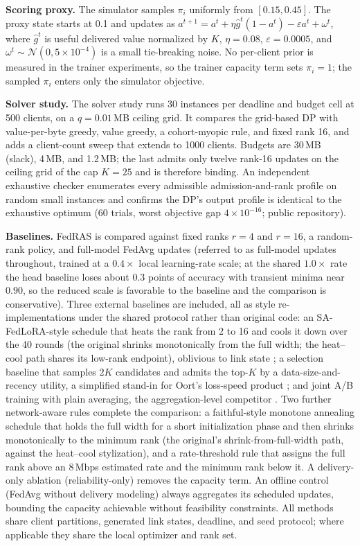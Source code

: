 \documentclass[a4paper,fleqn]{cas-dc}
\begin{document}
\par
\textbf{Scoring proxy.} The simulator samples $\pi_i$ uniformly from $[0.15,0.45]$. The proxy state starts at 0.1 and updates as $a^{t+1}=a^t+\eta\hat g^t(1-a^t)-\varepsilon a^t+\omega^t$, where $\hat g^t$ is useful delivered value normalized by $K$, $\eta=0.08$, $\varepsilon=0.0005$, and $\omega^t\sim\mathcal N(0,5\times10^{-4})$ is a small tie-breaking noise. No per-client prior is measured in the trainer experiments, so the trainer capacity term sets $\pi_i = 1$; the sampled $\pi_i$ enters only the simulator objective.
\par
\textbf{Solver study.} The solver study runs 30 instances per deadline and budget cell at 500 clients, on a $q = 0.01$\,MB ceiling grid. It compares the grid-based DP with value-per-byte greedy, value greedy, a cohort-myopic rule, and fixed rank 16, and adds a client-count sweep that extends to 1000 clients. Budgets are 30\,MB (slack), 4\,MB, and 1.2\,MB; the last admits only twelve rank-16 updates on the ceiling grid of the cap $K = 25$ and is therefore binding. An independent exhaustive checker enumerates every admissible admission-and-rank profile on random small instances and confirms the DP's output profile is identical to the exhaustive optimum (60 trials, worst objective gap $4\times10^{-16}$; public repository).
\par
\textbf{Baselines.} FedRAS is compared against fixed ranks $r = 4$ and $r = 16$, a random-rank policy, and full-model FedAvg updates (referred to as full-model updates throughout, trained at a $0.4\times$ local learning-rate scale; at the shared $1.0\times$ rate the head baseline loses about $0.3$ points of accuracy with transient minima near $0.90$, so the reduced scale is favorable to the baseline and the comparison is conservative). Three external baselines are included, all as style re-implementations under the shared protocol rather than original code: an SA-FedLoRA-style schedule that heats the rank from 2 to 16 and cools it down over the 40 rounds (the original shrinks monotonically from the full width; the heat--cool path shares its low-rank endpoint), oblivious to link state \cite{yang2024safedlora}; a selection baseline that samples $2K$ candidates and admits the top-$K$ by a data-size-and-recency utility, a simplified stand-in for Oort's loss-speed product \cite{oort2021oort}; and joint A/B training with plain averaging, the aggregation-level competitor \cite{guo2025fedsalora}. Two further network-aware rules complete the comparison: a faithful-style monotone annealing schedule that holds the full width for a short initialization phase and then shrinks monotonically to the minimum rank (the original's shrink-from-full-width path, against the heat--cool stylization), and a rate-threshold rule that assigns the full rank above an $8$\,Mbps estimated rate and the minimum rank below it. A delivery-only ablation (reliability-only) removes the capacity term. An offline control (FedAvg without delivery modeling) always aggregates its scheduled updates, bounding the capacity achievable without feasibility constraints. All methods share client partitions, generated link states, deadline, and seed protocol; where applicable they share the local optimizer and rank set.
\end{document}

